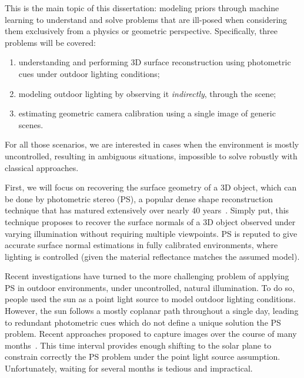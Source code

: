 This is the main topic of this dissertation: modeling priors through machine learning to understand and solve problems that are ill-posed when considering them exclusively from a physics or geometric perspective. Specifically, three problems will be covered: 
\begin{enumerate}
\item understanding and performing 3D surface reconstruction using photometric cues under outdoor lighting conditions;
\item modeling outdoor lighting by observing it \emph{indirectly}, through the scene;
\item estimating geometric camera calibration using a single image of generic scenes.
\end{enumerate}
For all those scenarios, we are interested in cases when the environment is mostly uncontrolled, resulting in ambiguous situations, impossible to solve robustly with classical approaches. 

First, we will focus on recovering the surface geometry of a 3D object, which can be done by photometric stereo (PS), a popular dense shape reconstruction technique that has matured extensively over nearly 40 years~\cite{woodham-opteng-80}. %
Simply put, this technique proposes to recover the surface normals of a 3D object observed under varying illumination without requiring multiple viewpoints. 
PS is reputed to give accurate surface normal estimations in fully calibrated environments, where lighting is controlled (given the material reflectance matches the assumed model). 

Recent investigations have turned to the more challenging problem of applying PS in outdoor environments, under uncontrolled, natural illumination. To do so, people used the sun as a point light source to model outdoor lighting conditions. However, the sun follows a mostly coplanar path throughout a single day, leading to redundant photometric cues which do not define a unique solution the PS problem. Recent approaches proposed to capture images over the course of many months~\cite{ackermann-cvpr-12,abrams-eccv-12}. This time interval provides enough shifting to the solar plane to constrain correctly the PS problem under the point light source assumption. Unfortunately, waiting for several months is tedious and impractical. 

